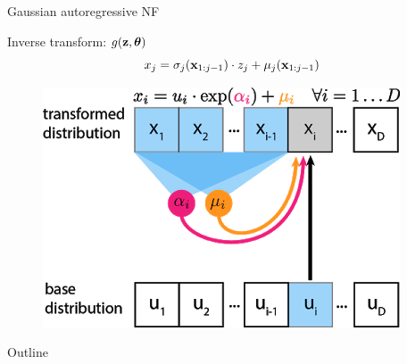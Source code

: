 \begin{frame}{Gaussian autoregressive NF}
	\begin{minipage}[t]{0.65\columnwidth}
		\begin{block}{Inverse transform: $g(\mathbf{z}, \boldsymbol{\theta})$}
			\[
			x_j = \sigma_j (\mathbf{x}_{1:j-1}) \cdot z_j + \mu_j(\mathbf{x}_{1:j-1})
			\]
		\end{block}
	\end{minipage}%
	\begin{minipage}[t]{0.35\columnwidth}
		\begin{figure}[h]
			\centering
			\includegraphics[width=.9\linewidth]{figs/af_iaf_explained_1.png}
		\end{figure}
	\end{minipage}
\end{frame}
\begin{frame}{Outline}
	\tableofcontents
\end{frame}

